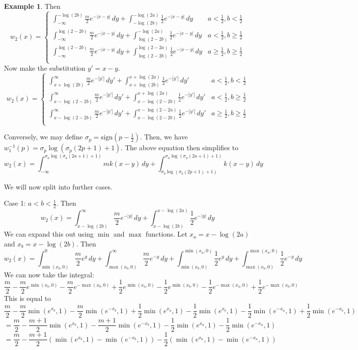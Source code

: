 \documentclass[11pt]{article}
\theoremstyle{definition}
\newtheorem{ex}[thm]{Example}
\numberwithin{equation}{section}
\numberwithin{thm}{section}
\begin{document}
\begin{ex}
Then
$$ w_2(x) = \begin{cases}
\int_{-\infty}^{-\log(2b)} \frac{m}{2}e^{-|x-y|}\,dy + \int_{-\log(2b)}^{-\log(2a)} \frac{1}{2}e^{-|x-y|} \,dy & a<\frac{1}{2}, b < \frac{1}{2} \\
\int_{-\infty}^{\log(2-2b)} \frac{m}{2}e^{-|x-y|} \,dy + \int_{\log(2-2b)}^{-\log(2a)} \frac{1}{2}e^{-|x-y|} \,dy & a<\frac{1}{2}, b \geq \frac{1}{2} \\ 
\int_{-\infty}^{\log(2-2b)} \frac{m}{2}e^{-|x-y|} \,dy + \int_{\log(2-2b)}^{\log(2-2a)} \frac{1}{2}e^{-|x-y|} \,dy & a\geq\frac{1}{2}, b \geq \frac{1}{2} \\
\end{cases} $$
Now make the substitution $y'=x-y$.
$$ w_2(x) = \begin{cases}
\int_{x+\log(2b)}^{\infty} \frac{m}{2}e^{-|y'|}\,dy' + \int_{x+\log(2b)}^{x+\log(2a)} \frac{1}{2}e^{-|y'|} \,dy' & a<\frac{1}{2}, b < \frac{1}{2} \\
\int_{x-\log(2-2b)}^{\infty} \frac{m}{2}e^{-|y'|} \,dy' + \int_{x-\log(2-2b)}^{x+\log(2a)} \frac{1}{2}e^{-|y'|} \,dy' & a<\frac{1}{2}, b \geq \frac{1}{2} \\ 
\int_{x-\log(2-2b)}^{\infty} \frac{m}{2}e^{-|y'|} \,dy' + \int_{x-\log(2-2b)}^{x-\log(2-2a)} \frac{1}{2}e^{-|y'|} \,dy' & a\geq\frac{1}{2}, b \geq \frac{1}{2} \\
\end{cases} $$

Conversely, we may define $\sigma_p=\text{sign}(p-\frac{1}{2})$. Then, we have $w_1^{-1}(p)=\sigma_p\log(\sigma_p(2p+1)+1)$. The above equation then simplifies to
\begin{equation}
w_2(x) = \int_{-\infty}^{\sigma_a\log(\sigma_a(2a+1)+1)} mk(x-y)\,dy + \int_{\sigma_b\log(\sigma_b(2p+1)+1)}^{\sigma_a\log(\sigma_a(2a+1)+1)} k(x-y)\,dy
\end{equation}

We will now split into further cases.

Case 1: $a<b<\frac{1}{2}$. Then
$$ w_2(x) = \int_{x-\log(2b)}^{\infty} \frac{m}{2}e^{-|y|}\,dy + \int_{x-\log(2b)}^{x-\log(2a)} \frac{1}{2}e^{-|y|} \,dy $$
We can expand this out using $\min$ and $\max$ functions. Let $x_a=x-\log(2a)$ and $x_b=x-\log(2b)$. Then
$$ w_2(x) = \int_{\min(x_b,0)}^0 \frac{m}{2} e^y \, dy + \int_{\max(x_b,0)}^{\infty} \frac{m}{2} e^{-y} \, dy
+ \int_{\min(x_b,0)}^{\min(x_a,0)} \frac{1}{2} e^y \, dy + \int_{\max(x_b,0)}^{\max(x_a,0)} \frac{1}{2} e^{-y} \, dy $$
We can now take the integral:
$$ \frac{m}{2} - \frac{m}{2} e^{\min(x_b,0)} - \frac{m}{2} e^{-\max(x_b,0)} + \frac{1}{2} e^{\min(x_a,0)} - \frac{1}{2} e^{\min(x_b,0)} - \frac{1}{2} e^{-\max(x_a,0)} + \frac{1}{2} e^{-\max(x_b,0)} $$
This is equal to
$$ \frac{m}{2} - \frac{m}{2} \min(e^{x_b},1) - \frac{m}{2} \min(e^{-x_b},1) + \frac{1}{2} \min(e^{x_a},1) - \frac{1}{2} \min(e^{x_b},1) - \frac{1}{2} \min(e^{-x_a},1) + \frac{1}{2} \min(e^{-x_b},1) $$
$$ = \frac{m}{2} - \frac{m+1}{2} \min(e^{x_b},1) - \frac{m+1}{2} \min(e^{-x_b},1) - \frac{1}{2} \min(e^{x_a},1) - \frac{1}{2} \min(e^{-x_a},1)$$
$$ = \frac{m}{2} - \frac{m+1}{2}\left( \min(e^{x_b},1) - \min(e^{-x_b},1) \right) - \frac{1}{2} \left( \min(e^{x_a},1) - \min(e^{-x_a},1) \right) $$


\end{ex}
\end{document}
